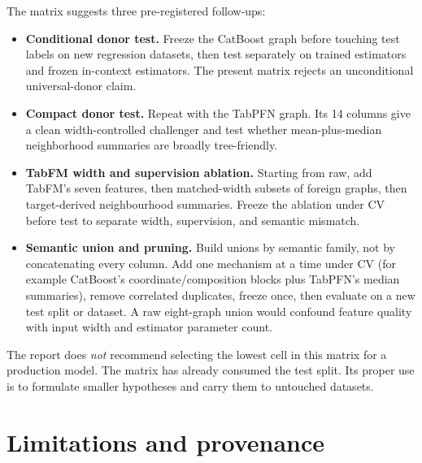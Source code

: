 \documentclass[10pt]{article}
\begin{document}
The matrix suggests three pre-registered follow-ups:

\begin{itemize}
  \item \textbf{Conditional donor test.}  Freeze the CatBoost graph before
  touching test labels on new regression datasets, then test separately on
  trained estimators and frozen in-context estimators.  The present matrix
  rejects an unconditional universal-donor claim.
  \item \textbf{Compact donor test.}  Repeat with the TabPFN graph.  Its 14
  columns give a clean width-controlled challenger and test whether
  mean-plus-median neighborhood summaries are broadly tree-friendly.
  \item \textbf{TabFM width and supervision ablation.}  Starting from raw,
  add TabFM's seven features, then matched-width subsets of foreign graphs,
  then target-derived neighbourhood summaries.  Freeze the ablation under CV
  before test to separate width, supervision, and semantic mismatch.
  \item \textbf{Semantic union and pruning.}  Build unions by semantic family,
  not by concatenating every column.  Add one mechanism at a time under CV
  (for example CatBoost's coordinate/composition blocks plus TabPFN's median
  summaries), remove correlated duplicates, freeze once, then evaluate on a
  new test split or dataset.  A raw eight-graph union would confound feature
  quality with input width and estimator parameter count.
\end{itemize}

The report does \emph{not} recommend selecting the lowest cell in this matrix
for a production model.  The matrix has already consumed the test split.  Its
proper use is to formulate smaller hypotheses and carry them to untouched
datasets.

\section{Limitations and provenance}
\end{document}
